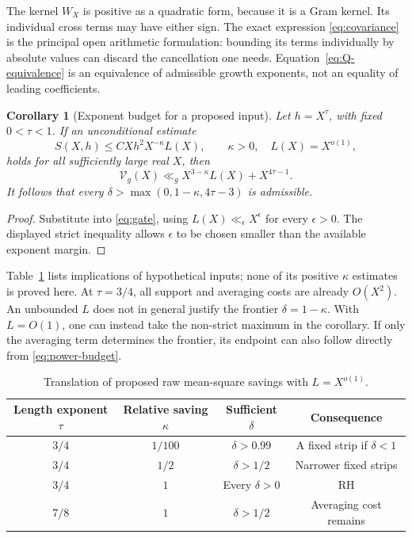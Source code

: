\documentclass[11pt]{article}
\newtheorem{corollary}[theorem]{Corollary}
\theoremstyle{remark}
\newcommand{\Vcal}{\mathcal V_g}
\numberwithin{equation}{section}
\begin{document}
The kernel $W_X$ is positive as a quadratic form, because it is a Gram
kernel. Its individual cross terms may have either sign. The exact
expression \eqref{eq:covariance} is the principal open arithmetic
formulation: bounding its terms individually by absolute values can
discard the cancellation one needs. Equation~\eqref{eq:Q-equivalence}
is an equivalence of admissible growth exponents, not an equality of
leading coefficients.

\begin{corollary}[Exponent budget for a proposed input]\label{cor:gate}
Let $h=X^\tau$, with fixed $0<\tau<1$. If an unconditional estimate
\begin{equation}\label{eq:candidate-S}
S(X,h)\le C Xh^2X^{-\kappa}L(X),\qquad \kappa>0,\quad
L(X)=X^{o(1)},
\end{equation}
holds for all sufficiently large real $X$, then
\begin{equation}\label{eq:power-budget}
\Vcal(X)\ll_g X^{3-\kappa}L(X)+X^{4\tau-1}.
\end{equation}
It follows that every $\delta>\max(0,1-\kappa,4\tau-3)$ is admissible.
\end{corollary}
\begin{proof}
Substitute into \eqref{eq:gate}, using $L(X)\ll_\epsilon X^\epsilon$
for every $\epsilon>0$. The displayed strict inequality allows
$\epsilon$ to be chosen smaller than the available exponent margin.
\end{proof}

Table~\ref{tab:budget} lists implications of hypothetical inputs;
none of its positive $\kappa$ estimates is proved here. At
$\tau=3/4$, all support and averaging costs are already $O(X^2)$.
An unbounded $L$ does not in general justify the frontier
$\delta=1-\kappa$. With $L=O(1)$, one can instead take the non-strict
maximum in the corollary. If only the averaging term determines the
frontier, its endpoint can also follow directly from
\eqref{eq:power-budget}.
\begin{table}[ht]
\centering
\begin{tabular}{cccc}
\toprule
Length exponent $\tau$ & Relative saving $\kappa$ & Sufficient $\delta$ & Consequence\\
\midrule
$3/4$ & $1/100$ & $\delta>0.99$ & A fixed strip if $\delta<1$\\
$3/4$ & $1/2$ & $\delta>1/2$ & Narrower fixed strips\\
$3/4$ & $1$ & Every $\delta>0$ & RH\\
$7/8$ & $1$ & $\delta>1/2$ & Averaging cost remains\\
\bottomrule
\end{tabular}
\caption{Translation of proposed raw mean-square savings with $L=X^{o(1)}$.}
\label{tab:budget}
\end{table}
\end{document}
